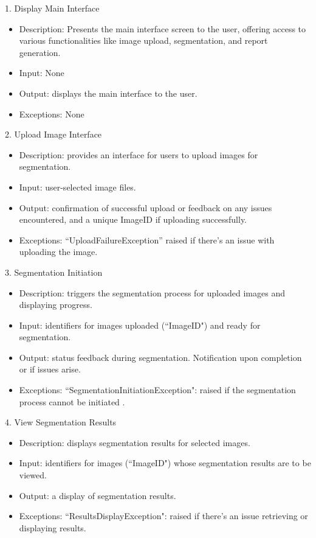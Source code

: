 \documentclass[12pt, titlepage]{article}
\begin{document}
1. Display Main Interface
\begin{itemize}
    \item Description: Presents the main interface screen to the user, offering access to various functionalities like image upload, segmentation, and report generation.
    \item Input: None
    \item Output: displays the main interface to the user.
    \item Exceptions: None
\end{itemize}
2. Upload Image Interface
\begin{itemize}
    \item Description: provides an interface for users to upload images for segmentation. 
    \item Input: user-selected image files.
    \item Output: confirmation of successful upload or feedback on any issues encountered, and a unique ImageID if uploading successfully.
    \item Exceptions: ``UploadFailureException” raised if there's an issue with uploading the image.
\end{itemize}

3. Segmentation Initiation
\begin{itemize}
    \item Description: triggers the segmentation process for uploaded images and displaying progress.
    \item Input: identifiers for images uploaded (``ImageID") and ready for segmentation.
    \item Output: status feedback during segmentation.
Notification upon completion or if issues arise.
    \item Exceptions: ``SegmentationInitiationException": raised if the segmentation process cannot be initiated .
\end{itemize}

4. View Segmentation Results
\begin{itemize}
    \item Description: displays segmentation results for selected images.
    \item Input: identifiers for images (``ImageID") whose segmentation results are to be viewed.
    \item Output: a display of segmentation results.
    \item Exceptions: ``ResultsDisplayException": raised if there's an issue retrieving or displaying results.
\end{itemize}
\end{document}
